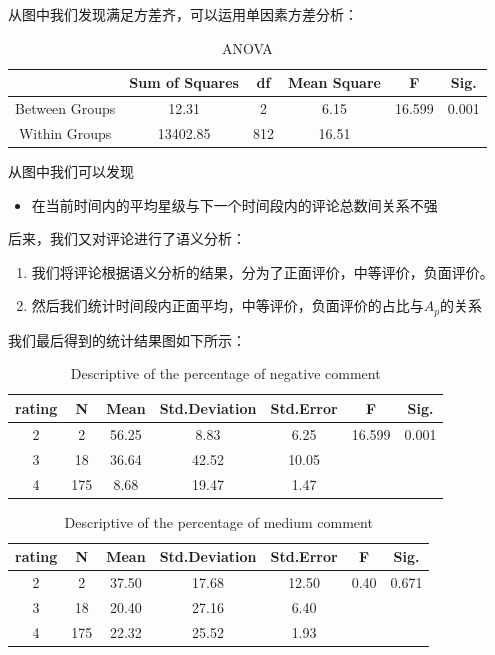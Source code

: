 \documentclass{mcmthesis}
\begin{document}
从图中我们发现满足方差齐，可以运用单因素方差分析：\\
\begin{table}[htb]
	\center
	\caption{ANOVA}
	\label{type}
	\begin{tabular}{c|c|c|c|c|c}
		\hline
		\textbf{ } & \textbf{Sum of Squares} & \textbf{df}& \textbf{Mean Square}& \textbf{F}&  \textbf{Sig.} \\ \hline 
		Between Groups                     & 12.31           & 2         & 6.15    &16.599 &0.001   \\ 
		Within Groups                     & 13402.85          & 812         & 16.51    &  & \\ \hline		
	\end{tabular}
\end{table}
从图中我们可以发现
\begin{itemize}
	\item 在当前时间内的平均星级与下一个时间段内的评论总数间关系不强
\end{itemize}
后来，我们又对评论进行了语义分析：
\begin{enumerate}
	\item 我们将评论根据语义分析的结果，分为了正面评价，中等评价，负面评价。
	\item 然后我们统计时间段内正面平均，中等评价，负面评价的占比与$A_p$的关系
\end{enumerate}
我们最后得到的统计结果图如下所示：\\

\begin{table}[htb]
	\center
	\caption{Descriptive of the percentage of negative comment}
	\label{type}
	\begin{tabular}{c|c|c|c|c|c|c}
		\hline
		\textbf{rating} & \textbf{N} & \textbf{Mean}& \textbf{Std.Deviation}& \textbf{Std.Error}& \textbf{F}& \textbf{Sig.} \\ \hline 
		2        & 2             & 56.25           & 8.83         & 6.25    & 16.599 & 0.001    \\
		3          & 18           & 36.64           & 42.52         & 10.05    &  & \\
		4            & 175         & 8.68           & 19.47         & 1.47    &  & \\ \hline
	\end{tabular}
\end{table}

\begin{table}[htb]
	\center
	\caption{Descriptive of the percentage of medium comment}
	\label{type}
	\begin{tabular}{c|c|c|c|c|c|c}
		\hline
		\textbf{rating} & \textbf{N} & \textbf{Mean}& \textbf{Std.Deviation}& \textbf{Std.Error}& \textbf{F}& \textbf{Sig.} \\ \hline 
		2        & 2             & 37.50           & 17.68         & 12.50    & 0.40 & 0.671    \\
		3          & 18           & 20.40           & 27.16         & 6.40    &  & \\
		4            & 175         & 22.32           & 25.52         & 1.93    &  & \\ \hline
	\end{tabular}
\end{table}
\end{document}
